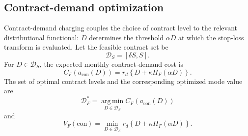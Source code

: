 \documentclass[Times1COL]{WileyNJDv5}
\begin{document}
\subsection{Contract-demand optimization}
\label{sec:contract-optimization}

Contract-demand charging couples the choice of contract level to the relevant distributional functional: $D$ determines the threshold $\alpha D$ at which the stop-loss transform is evaluated. Let the feasible contract set be
\[
\mathcal{D}_S=[\delta S,S].
\]
For $D\in\mathcal{D}_S$, the expected monthly contract-demand cost is
\[
C_F\!\left(a_{\mathrm{con}}(D)\right)
=
r_d\left\{D+\kappa H_F(\alpha D)\right\}.
\]
The set of optimal contract levels and the corresponding optimized mode value are
\[
\mathcal{D}_F^\ast
=
\operatorname*{arg\,min}_{D\in\mathcal{D}_S}
C_F\!\left(a_{\mathrm{con}}(D)\right)
\]
and
\[
V_F(\mathrm{con})
=
\min_{D\in\mathcal{D}_S}
r_d\left\{D+\kappa H_F(\alpha D)\right\}.
\]
\end{document}
